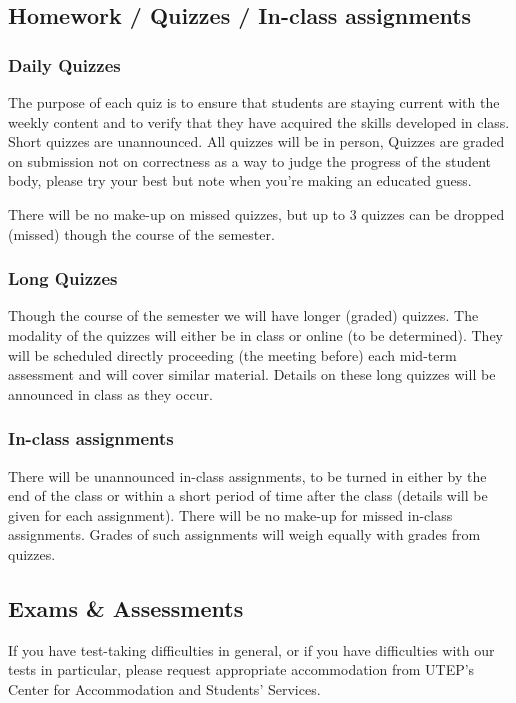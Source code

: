 \documentclass[12pt]{scrartcl}
\begin{document}
\subsection{Homework / Quizzes / In-class assignments}

\subsubsection{Daily Quizzes}
The purpose of each quiz is to ensure that students are staying current with the weekly content and to verify that they have acquired the skills developed in class. 
Short quizzes are unannounced. 
All quizzes will be in person, 
Quizzes are graded on submission not on correctness as a way to judge the progress of the student body, please try your best but note when you're making an educated guess. 

There will be no make-up on missed quizzes, but up to 3 quizzes can be dropped (missed) though the course of the semester.
 
 \subsubsection{Long Quizzes}
 Though the course of the semester we will have longer (graded) quizzes. 
 The modality of the quizzes will either be in class or online (to be determined). 
 They will be scheduled directly proceeding (the meeting before) each mid-term assessment and will cover similar material. 
 Details on these long quizzes will be announced in class as they occur. 
 
\subsubsection{In-class assignments}
There will be unannounced in-class assignments, to be turned in either by the end of the class or within a short period of time after the class (details will be given for each assignment). 
There will be no make-up for missed in-class assignments. 
Grades of such assignments will weigh equally with grades from quizzes. 


\subsection{Exams \& Assessments}
If you have test-taking difficulties in general, or if you have difficulties with our tests in particular, please request appropriate accommodation from UTEP’s Center for Accommodation and Students’ Services.
\end{document}
